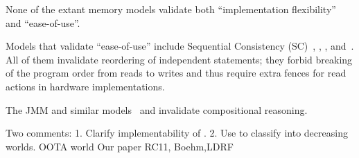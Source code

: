 None of the extant memory models validate both ``implementation flexibility'' and ``ease-of-use''.  

Models that validate ``ease-of-use'' include Sequential Consistency (SC)~\citet{Lamport:1979:MMC:1311099.1311750}, \citet{Dolan:2018:BDR:3192366.3192421}, \citet{RC11refs}, \citet{DBLP:conf/lics/JeffreyR16} and~\citet{BoehmOOTA}.  All of them invalidate reordering of independent statements; they forbid breaking of the program order from reads to writes and thus require extra fences for read actions in hardware implementations.

The JMM\citet{Manson:2005:JMM:1047659.1040336} and similar models~\citet{DBLP:conf/esop/JagadeesanPR10} and \citet{DBLP:conf/popl/KangHLVD17} invalidate compositional reasoning.  

Two comments:
1. Clarify implementability of \citet{DBLP:conf/lics/JeffreyR16}.
2. Use\cite{BoehmOOTA} to 
classify into decreasing worlds.
           OOTA world
              Our paper
                 RC11, Boehm,LDRF






